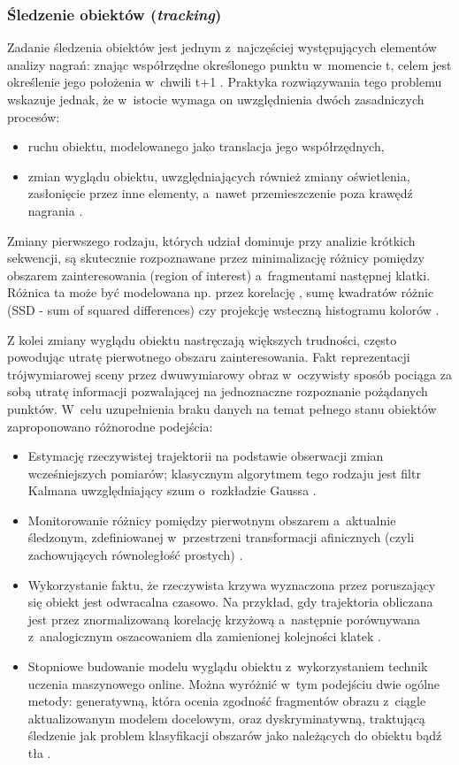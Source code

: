 \subsubsection{Śledzenie obiektów (\emph{tracking})}
Zadanie śledzenia obiektów jest jednym z~najczęściej występujących elementów analizy nagrań: znając współrzędne określonego punktu w~momencie t, celem jest określenie jego położenia w~chwili t+1 \cite{medianflow}. Praktyka rozwiązywania tego problemu wskazuje jednak, że w~istocie wymaga on uwzględnienia dwóch zasadniczych procesów:
\begin{itemize}
    \item ruchu obiektu, modelowanego jako translacja jego współrzędnych,
    \item zmian wyglądu obiektu, uwzględniających również zmiany oświetlenia, zasłonięcie przez inne elementy, a~nawet przemieszczenie poza krawędź nagrania \cite{shi94}.
\end{itemize}

Zmiany pierwszego rodzaju, których udział dominuje przy analizie krótkich sekwencji, są skutecznie rozpoznawane przez minimalizację różnicy pomiędzy obszarem zainteresowania (region of interest) a~fragmentami następnej klatki. Różnica ta może być modelowana np. przez korelację \cite{mosse}, sumę kwadratów różnic (SSD - sum of squared differences) \cite{medianflow} czy projekcję wsteczną histogramu kolorów \cite{meanshift}.

Z kolei zmiany wyglądu obiektu nastręczają większych trudności, często powodując utratę pierwotnego obszaru zainteresowania. Fakt reprezentacji trójwymiarowej sceny przez dwuwymiarowy obraz w~oczywisty sposób pociąga za sobą utratę informacji pozwalającej na jednoznaczne rozpoznanie pożądanych punktów. W~celu uzupełnienia braku danych na temat pełnego stanu obiektów zaproponowano różnorodne podejścia:
\begin{itemize}
    \item Estymację rzeczywistej trajektorii na podstawie obserwacji zmian wcześniejszych pomiarów; klasycznym algorytmem tego rodzaju jest filtr Kalmana uwzględniający szum o~rozkładzie Gaussa \cite{kalman}.
    \item Monitorowanie różnicy pomiędzy pierwotnym obszarem a~aktualnie śledzonym, zdefiniowanej w~przestrzeni transformacji afinicznych (czyli zachowujących równoległość prostych) \cite{shi94}.
    \item Wykorzystanie faktu, że rzeczywista krzywa wyznaczona przez poruszający się obiekt jest odwracalna czasowo. Na przykład, gdy trajektoria obliczana jest przez znormalizowaną korelację krzyżową a~następnie porównywana z~analogicznym oszacowaniem dla zamienionej kolejności klatek \cite{medianflow}.
    \item Stopniowe budowanie modelu wyglądu obiektu z~wykorzystaniem technik uczenia
 maszynowego online. Można wyróżnić w~tym podejściu dwie ogólne metody: generatywną, która ocenia zgodność fragmentów obrazu z~ciągle aktualizowanym modelem docelowym, oraz dyskryminatywną, traktującą śledzenie jak problem klasyfikacji obszarów jako należących do obiektu bądź tła .
\end{itemize}